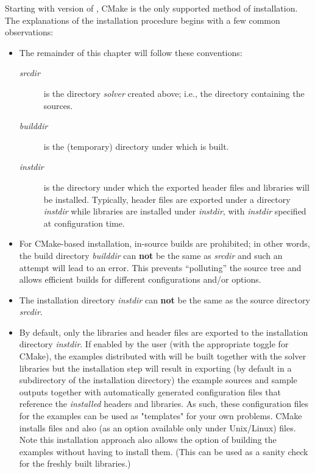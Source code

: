 Starting with version  of {\sundials}, CMake is the only supported method
of installation.
The explanations of the installation procedure begins with a few common observations:
\begin{itemize}

\item The remainder of this chapter will follow these conventions:
  \begin{description}
  \item[{\em srcdir}] 
    is the directory {\em solver} created above; i.e., the 
    directory containing the {\sundials} sources.
  \item[{\em builddir}]
    is the (temporary) directory under which {\sundials} is built.
  \item[{\em instdir}]
    is the directory under which the {\sundials} exported header files
    and libraries will be installed. Typically, header files are exported under a directory
    {\em instdir} while libraries are installed under {\em instdir},
    with {\em instdir} specified at configuration time.
  \end{description}

\item For {\sundials} CMake-based installation, in-source builds are prohibited; in other words, the
  build directory {\em builddir} can {\bf not} be the same as {\em srcdir}
  and such an attempt will lead to an error. This
  prevents ``polluting'' the source tree and allows efficient builds
  for different configurations and/or options.

\item {\warn}The installation directory {\em instdir} can {\bf not} be the same as
  the source directory {\em srcdir}.

\item By default, only the libraries and header files are exported to the installation
  directory {\em instdir}.  If enabled by the user (with the
  appropriate toggle for CMake), the
  examples distributed with {\sundials} will be built together with
  the solver libraries but the installation step will result in
  exporting (by default in a subdirectory of the installation
  directory) the example sources and sample outputs together with
  automatically generated configuration files that reference the {\em
  installed} {\sundials} headers and libraries.  As such, these
  configuration files for the {\sundials} examples can be used as
  "templates" for your own problems. CMake installs  files and also
  (as an option available only under Unix/Linux)  files. Note this
  installation approach also allows the option of building the
  {\sundials} examples without having to install them.  (This can be
  used as a sanity check for the freshly built libraries.)


\end{itemize}
